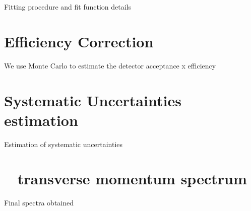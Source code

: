 Fitting procedure and fit function details

\section{Efficiency Correction}
\label{par:5.2}
We use Monte Carlo to estimate the detector acceptance x efficiency


\section{Systematic Uncertainties estimation}
\label{par:5.3}
Estimation of systematic uncertainties

\section{\simplekstarch~ transverse momentum spectrum}
\label{par:5.4} 

Final \pT spectra obtained















 
